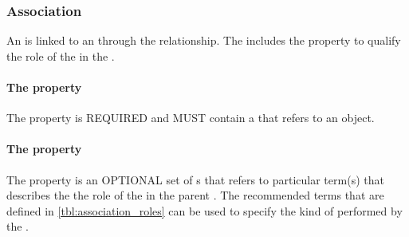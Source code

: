 \subsubsection{Association}
\label{sec:Association}
An  is linked to an  through the  relationship. The  includes the  property to qualify the role of the  in the .

\paragraph{The  property}\label{sec:agent}
The  property is REQUIRED and MUST contain a  that refers to an  object.

\paragraph{The  property}\label{sec:roles:A} 
The  property is an OPTIONAL set of s that refers to particular term(s) that describes the the role of the  in the parent . 
The recommended terms that are defined in \ref{tbl:association_roles} can be used to specify the kind of  performed by the .



